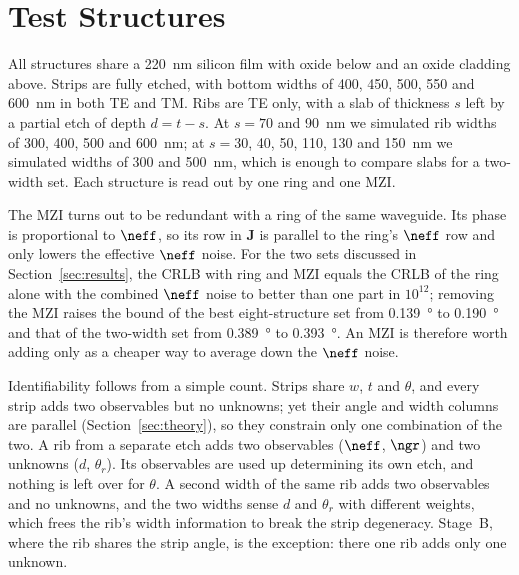\section{Test Structures}
\label{sec:structures}

All structures share a \qty{220}{nm} silicon film with oxide below and an oxide cladding above. Strips are fully
etched, with bottom widths of 400, 450, 500, 550 and \qty{600}{nm} in both TE and TM. Ribs are TE only, with a slab
of thickness $s$ left by a partial etch of depth $d=t-s$. At $s=70$ and \qty{90}{nm} we simulated rib widths of 300,
400, 500 and \qty{600}{nm}; at $s=30$, 40, 50, 110, 130 and \qty{150}{nm} we simulated widths of 300 and
\qty{500}{nm}, which is enough to compare slabs for a two-width set. Each structure is read out by one ring and one
MZI.

The MZI turns out to be redundant with a ring of the same waveguide. Its phase is proportional to $\neff$, so its row
in $\mathbf{J}$ is parallel to the ring's $\neff$ row and only lowers the effective $\neff$ noise. For the two sets
discussed in Section~\ref{sec:results}, the CRLB with ring and MZI equals the CRLB of the ring alone with the combined
$\neff$ noise to better than one part in $10^{12}$; removing the MZI raises the bound of the best eight-structure set
from \qty{0.139}{\degree} to \qty{0.190}{\degree} and that of the two-width set from \qty{0.389}{\degree} to \qty{0.393}{\degree}. An MZI is therefore worth adding only as a cheaper way to average down the $\neff$ noise.

Identifiability follows from a simple count. Strips share $w$, $t$ and $\theta$, and every strip adds two observables
but no unknowns; yet their angle and width columns are parallel (Section~\ref{sec:theory}), so they constrain only
one combination of the two. A rib from a separate etch adds two observables ($\neff$, $\ngr$) and two unknowns ($d$,
$\theta_r$). Its observables are used up determining its own etch, and nothing is left over for $\theta$. A second
width of the same rib adds two observables and no unknowns, and the two widths sense $d$ and $\theta_r$ with
different weights, which frees the rib's width information to break the strip degeneracy. Stage~B, where the rib
shares the strip angle, is the exception: there one rib adds only one unknown.
